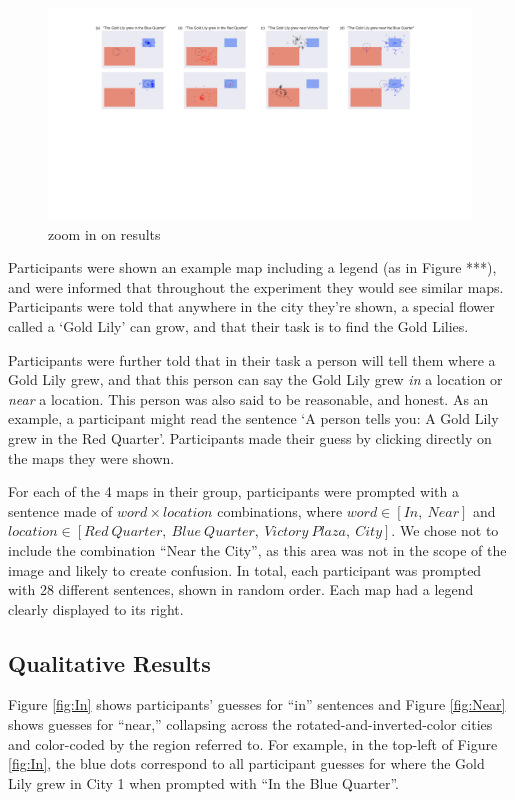 \documentclass[10pt,letterpaper]{article}
\begin{document}
\begin{figure}[!t]
\center
\includegraphics[width=\textwidth]{figures/results1.pdf}
\caption{zoom in on results}
\label{fig:zoomIn}
\end{figure}

Participants were shown an example map including a legend (as in Figure ***), and were informed that throughout the experiment they would see similar maps. Participants were told that anywhere in the city they're shown, a special flower called a `Gold Lily' can grow, and that their task is to find the Gold Lilies. 

Participants were further told that in their task a person will tell them where a Gold Lily grew, and that this person can say the Gold Lily grew \textit{in} a location or \textit{near} a location. This person was also said to be reasonable, and honest. As an example, a participant might read the sentence `A person tells you: A Gold Lily grew in the Red Quarter'. Participants made their guess by clicking directly on the maps they were shown.

For each of the 4 maps in their group, participants were prompted with a sentence made of $word \times location$ combinations, where $word \in [In,\ Near]$ and $location \in [Red\ Quarter,\ Blue\ Quarter,\ Victory\ Plaza,\ City]$. We chose not to include the combination ``Near the City'', as this area was not in the scope of the image and likely to create confusion. In total, each participant was prompted with 28 different sentences, shown in random order. Each map had a legend clearly displayed to its right. 

\subsection{Qualitative Results} 

Figure \ref{fig:In} shows participants' guesses for ``in'' sentences and Figure \ref{fig:Near} shows guesses for ``near,'' collapsing across the rotated-and-inverted-color cities and color-coded by the region referred to. For example, in the top-left of Figure \ref{fig:In}, the blue dots correspond to all participant guesses for where the Gold Lily grew in City 1 when prompted with ``In the Blue Quarter''. 
\end{document}
